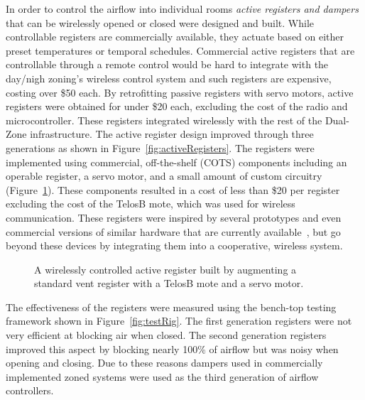 In order to control the airflow into individual rooms {\em active registers and
dampers} that can be wirelessly opened or closed were designed and built. While
controllable registers are commercially available, they actuate based on either
preset temperatures or temporal schedules. Commercial active registers that are
controllable through a remote control would be hard to integrate with the
day/nigh zoning's wireless control system and such registers are expensive,
costing over \$50 each. By retrofitting passive registers with servo motors,
active registers were obtained for under \$20 each, excluding the cost of the
radio and microcontroller. These registers integrated wirelessly with the rest
of the Dual-Zone infrastructure. The active register design improved
through three generations as shown in Figure~\ref{fig:activeRegisters}. The
registers were implemented using commercial, off-the-shelf (COTS) components
including an operable register, a servo motor, and a small amount of custom
circuitry (Figure~\ref{fig:activeRegister}).  These components resulted in a
cost of less than \$20 per register excluding the cost of the TelosB mote, which
was used for wireless communication. These registers were inspired by several
prototypes and even commercial versions of similar hardware that are currently
available~\cite{walker2003register,walker2008residential,watts2007application,TRANE2003},
but go beyond these devices by integrating them into a cooperative, wireless
system.

\begin{figure}[!htb]
   \caption[Details of an active register]{A
    wirelessly controlled active register built by augmenting a standard vent
    register with a TelosB mote and a servo motor.} 
\label{fig:activeRegister}
\end{figure}

The effectiveness of the registers were measured using the bench-top testing
framework shown in Figure~\ref{fig:testRig}. The first generation registers were
not very efficient at blocking air when closed. The second generation registers
improved this aspect by blocking nearly 100\% of airflow but was noisy when
opening and closing. Due to these reasons dampers used in commercially
implemented zoned systems were used as the third generation of airflow
controllers.

